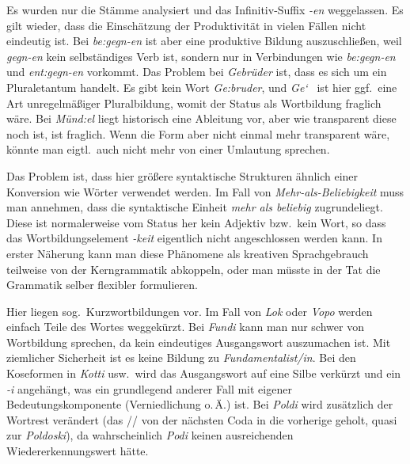 \begin{sloppypar}

Es wurden nur die Stämme analysiert und das Infinitiv-Suffix \textit{-en} weggelassen.
Es gilt wieder, dass die Einschätzung der Produktivität in vielen Fällen nicht eindeutig ist.
Bei \textit{be:gegn-en} ist aber \zB eine produktive Bildung auszuschließen, weil \textit{gegn-en} kein selbständiges Verb ist, sondern nur in Verbindungen wie \textit{be:gegn-en} und \textit{ent:gegn-en} vorkommt.
Das Problem bei \textit{Gebrüder} ist, dass es sich um ein Pluraletantum handelt.
Es gibt kein Wort \textit{\Ast Ge:bruder}, und \textit{Ge\char`~} ist hier ggf.\ eine Art unregelmäßiger Pluralbildung, womit der Status als Wortbildung fraglich wäre.
Bei \textit{Münd:el} liegt historisch eine Ableitung vor, aber wie transparent diese noch ist, ist fraglich.
Wenn die Form aber nicht einmal mehr transparent wäre, könnte man eigtl.\ auch nicht mehr von einer Umlautung sprechen.

\end{sloppypar}


Das Problem ist, dass hier größere syntaktische Strukturen ähnlich einer Konversion wie Wörter verwendet werden.
Im Fall von \textit{Mehr-als-Beliebigkeit} muss man \zB annehmen, dass die syntaktische Einheit \textit{mehr als beliebig} zugrundeliegt.
Diese ist normalerweise vom Status her kein Adjektiv bzw.\ kein Wort, so dass das Wortbildungselement \textit{-keit} eigentlich nicht angeschlossen werden kann.
In erster Näherung kann man diese Phänomene als kreativen Sprachgebrauch teilweise von der Kerngrammatik abkoppeln, oder man müsste in der Tat die Grammatik selber flexibler formulieren.


Hier liegen sog.\ Kurzwortbildungen vor.
Im Fall von \textit{Lok} oder \textit{Vopo} werden einfach Teile des Wortes weggekürzt.
Bei \textit{Fundi} kann man nur schwer von Wortbildung sprechen, da kein eindeutiges Ausgangswort auszumachen ist.
Mit ziemlicher Sicherheit ist es keine Bildung zu \textit{Fundamentalist\slash in}.
Bei den Koseformen in \textit{Kotti} usw.\ wird das Ausgangswort auf eine Silbe verkürzt und ein \textit{-i} angehängt, was ein grundlegend anderer Fall mit eigener Bedeutungskomponente (Verniedlichung o.\,Ä.) ist.
Bei \textit{Poldi} wird zusätzlich der Wortrest verändert (das // von der nächsten Coda in die vorherige geholt, quasi zur \textit{Poldoski}), da wahrscheinlich \textit{Podi} keinen ausreichenden Wiedererkennungswert hätte.

